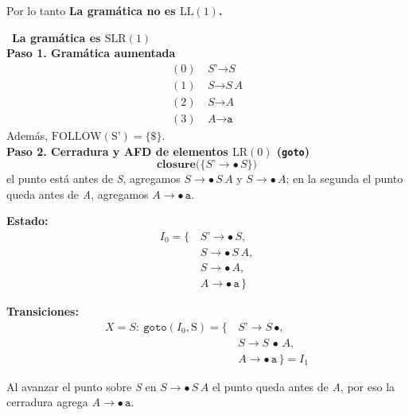 \documentclass[12pt,letterpaper]{article}
\newcommand{\nt}[1]{\textit{#1}}
\newcommand{\tk}[1]{\texttt{#1}}
\newcommand{\tx}[1]{\text{#1}}
\newcommand{\Follow}[1]{\mathrm{FOLLOW}(#1)}
\renewcommand{\ll}{\mathrm{LL(1)}}
\newcommand{\lrc}{\mathrm{LR(0)}}
\newcommand{\slr}{\mathrm{SLR(1)}}
\begin{document}
\begin{enumerate}[label=\arabic*.]
  Por lo tanto \textbf{La gramática no es $\ll$.}

  \bigskip
  \bigskip

  \ \textbf{\large La gramática es $\slr$}\\

  \textbf{Paso 1. Gramática aumentada}
  \[
  \begin{aligned}
    (0)\ & \nt{S'} \to \nt{S} \\
    (1)\ & \nt{S} \to \nt{S}\,\nt{A} \\
    (2)\ & \nt{S} \to \nt{A} \\
    (3)\ & \nt{A} \to \tk{a}
  \end{aligned}
  \]
  Además, $\Follow{\tx{S'}} = \{\tk{\$}\}$.\\

  \textbf{Paso 2. Cerradura y AFD de elementos $\lrc$ (\texttt{goto})}\\[4pt]

  \[
  \textbf{closure}\big(\{\nt{S'}\to\bullet\,\nt{S}\}\big)
  \]
  el punto está antes de \nt{S}, agregamos $\nt{S}\to\bullet\,\nt{S}\,\nt{A}$ y $\nt{S}\to\bullet\,\nt{A}$;
  en la segunda el punto queda antes de \nt{A}, agregamos $\nt{A}\to\bullet\,\tk{a}$.

  \medskip

  \textbf{Estado:}
  \[
  \begin{aligned}
    I_0 = \{\, & \nt{S'}\to\bullet\,\nt{S},\\
               & \nt{S}\to\bullet\,\nt{S}\,\nt{A},\\
               & \nt{S}\to\bullet\,\nt{A},\\
               & \nt{A}\to\bullet\,\tk{a}\,\}
  \end{aligned}
  \]

  \textbf{Transiciones:}
  \[
  \begin{aligned}
    X=\nt{S}:\ \texttt{goto}(I_0,\tx{S}) = \{\, & \nt{S'}\to\nt{S}\,\bullet,\\
                                                & \nt{S}\to\nt{S}\,\bullet\,\nt{A},\\
                                                & \nt{A}\to\bullet\,\tk{a}\,\} = \boxed{I_1}
  \end{aligned}
  \]
  
  Al avanzar el punto sobre \nt{S} en $\nt{S}\to\bullet\,\nt{S}\,\nt{A}$ el punto queda antes de \nt{A}, por
  eso la cerradura agrega $\nt{A}\to\bullet\,\tk{a}$.


\end{enumerate}
\end{document}
